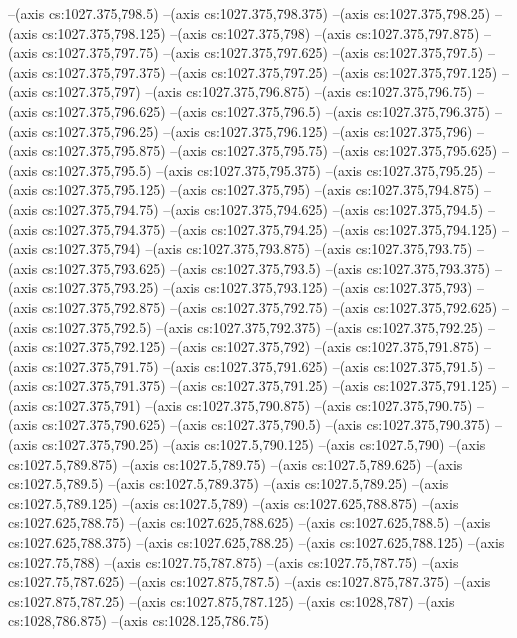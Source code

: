 --(axis cs:1027.375,798.5)
--(axis cs:1027.375,798.375)
--(axis cs:1027.375,798.25)
--(axis cs:1027.375,798.125)
--(axis cs:1027.375,798)
--(axis cs:1027.375,797.875)
--(axis cs:1027.375,797.75)
--(axis cs:1027.375,797.625)
--(axis cs:1027.375,797.5)
--(axis cs:1027.375,797.375)
--(axis cs:1027.375,797.25)
--(axis cs:1027.375,797.125)
--(axis cs:1027.375,797)
--(axis cs:1027.375,796.875)
--(axis cs:1027.375,796.75)
--(axis cs:1027.375,796.625)
--(axis cs:1027.375,796.5)
--(axis cs:1027.375,796.375)
--(axis cs:1027.375,796.25)
--(axis cs:1027.375,796.125)
--(axis cs:1027.375,796)
--(axis cs:1027.375,795.875)
--(axis cs:1027.375,795.75)
--(axis cs:1027.375,795.625)
--(axis cs:1027.375,795.5)
--(axis cs:1027.375,795.375)
--(axis cs:1027.375,795.25)
--(axis cs:1027.375,795.125)
--(axis cs:1027.375,795)
--(axis cs:1027.375,794.875)
--(axis cs:1027.375,794.75)
--(axis cs:1027.375,794.625)
--(axis cs:1027.375,794.5)
--(axis cs:1027.375,794.375)
--(axis cs:1027.375,794.25)
--(axis cs:1027.375,794.125)
--(axis cs:1027.375,794)
--(axis cs:1027.375,793.875)
--(axis cs:1027.375,793.75)
--(axis cs:1027.375,793.625)
--(axis cs:1027.375,793.5)
--(axis cs:1027.375,793.375)
--(axis cs:1027.375,793.25)
--(axis cs:1027.375,793.125)
--(axis cs:1027.375,793)
--(axis cs:1027.375,792.875)
--(axis cs:1027.375,792.75)
--(axis cs:1027.375,792.625)
--(axis cs:1027.375,792.5)
--(axis cs:1027.375,792.375)
--(axis cs:1027.375,792.25)
--(axis cs:1027.375,792.125)
--(axis cs:1027.375,792)
--(axis cs:1027.375,791.875)
--(axis cs:1027.375,791.75)
--(axis cs:1027.375,791.625)
--(axis cs:1027.375,791.5)
--(axis cs:1027.375,791.375)
--(axis cs:1027.375,791.25)
--(axis cs:1027.375,791.125)
--(axis cs:1027.375,791)
--(axis cs:1027.375,790.875)
--(axis cs:1027.375,790.75)
--(axis cs:1027.375,790.625)
--(axis cs:1027.375,790.5)
--(axis cs:1027.375,790.375)
--(axis cs:1027.375,790.25)
--(axis cs:1027.5,790.125)
--(axis cs:1027.5,790)
--(axis cs:1027.5,789.875)
--(axis cs:1027.5,789.75)
--(axis cs:1027.5,789.625)
--(axis cs:1027.5,789.5)
--(axis cs:1027.5,789.375)
--(axis cs:1027.5,789.25)
--(axis cs:1027.5,789.125)
--(axis cs:1027.5,789)
--(axis cs:1027.625,788.875)
--(axis cs:1027.625,788.75)
--(axis cs:1027.625,788.625)
--(axis cs:1027.625,788.5)
--(axis cs:1027.625,788.375)
--(axis cs:1027.625,788.25)
--(axis cs:1027.625,788.125)
--(axis cs:1027.75,788)
--(axis cs:1027.75,787.875)
--(axis cs:1027.75,787.75)
--(axis cs:1027.75,787.625)
--(axis cs:1027.875,787.5)
--(axis cs:1027.875,787.375)
--(axis cs:1027.875,787.25)
--(axis cs:1027.875,787.125)
--(axis cs:1028,787)
--(axis cs:1028,786.875)
--(axis cs:1028.125,786.75)
